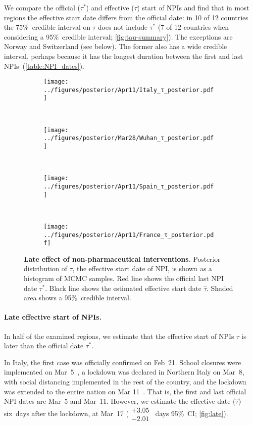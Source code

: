 \documentclass[12pt]{extarticle}
\begin{document}
We compare the official ($\tau^*$) and effective ($\tau$) start of NPIs and find that in most regions the effective start date differs from the official date: in 10 of 12 countries the 75\%~credible interval on $\tau$ does not include $\tau^*$ (7 of 12 countries when considering a 95\%~credible interval; \autoref{fig:tau-summary}).
The exceptions are Norway and Switzerland (see below).
The former also has a wide credible interval, perhaps because it has the longest duration between the first and last NPIs~(\autoref{table:NPI_dates}).



\begin{figure}[h]
    \centering
    \begin{subfigure}{0.45\textwidth}
        \texttt{[image: ../figures/posterior/Apr11/Italy\_τ\_posterior.pdf]}
    \end{subfigure}
  	~
    \begin{subfigure}{0.45\textwidth}
        \texttt{[image: ../figures/posterior/Mar28/Wuhan\_τ\_posterior.pdf]}
    \end{subfigure}
    \\
    \begin{subfigure}{0.45\textwidth}
        \texttt{[image: ../figures/posterior/Apr11/Spain\_τ\_posterior.pdf]}
    \end{subfigure}
    ~
    \begin{subfigure}{0.45\textwidth}
		\texttt{[image: ../figures/posterior/Apr11/France\_τ\_posterior.pdf]}
    \end{subfigure}
    \caption{
	\textbf{Late effect of non-pharmaceutical interventions.}
    Posterior distribution of $\tau$, the effective start date of NPI, is shown as a histogram of MCMC samples. Red line shows the official last NPI date $\tau^*$. Black line shows the estimated effective start date $\hat{\tau}$. Shaded area shows a 95\%~credible interval. 
    }
    \label{fig:late}
\end{figure}



\paragraph*{Late effective start of NPIs.}
In half of the examined regions, we estimate that the effective start of NPIs $\tau$ is later than the official date $\tau^*$.
 
In Italy, the first case was officially confirmed on Feb~21. School closures were implemented on Mar~5~\citep{Flaxman2020}, a lockdown was declared in Northern Italy on Mar~8, with social distancing implemented in the rest of the country, and the lockdown was extended to the entire nation on Mar 11~\citep{Gatto2020}.
That is, the first and last official NPI dates are Mar~5 and Mar~11.
However, we estimate the effective date ($\hat{\tau}$) six~days after the lockdown, at Mar~17 ($\substack{+3.05 \\ -2.01}$~days 95\%~CI; \autoref{fig:late}). 
\end{document}

